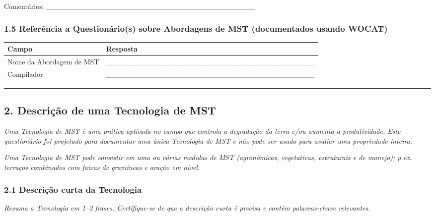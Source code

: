 Comentários: \_\_\_\_\_\_\_\_\_\_\_\_\_\_\_\_\_\_\_\_\_\_\_\_\_\_\_\_\_\_\_\_\_\_\_\_\_\_\_\_

\subsubsection{1.5 Referência a Questionário(s) sobre Abordagens de MST (documentados usando WOCAT)}\label{referuxeancia-a-questionuxe1rios-sobre-abordagens-de-mst-documentados-usando-wocat}

{
\begin{longtable}[]{@{}ll@{}}
\toprule\noalign{}
Campo & Resposta \\
\midrule\noalign{}
\endhead
\bottomrule\noalign{}
\endlastfoot
Nome da Abordagem de MST & \_\_\_\_\_\_\_\_\_\_\_\_\_\_\_\_\_\_\_\_\_\_\_\_\_\_\_\_\_\_\_\_\_\_\_\_\_\_\_\_ \\
Compilador & \_\_\_\_\_\_\_\_\_\_\_\_\_\_\_\_\_\_\_\_\_\_\_\_\_\_\_\_\_\_\_\_\_\_\_\_\_\_\_\_ \\
\end{longtable}
}

\newpage

\begin{center}\rule{0.5\linewidth}{0.5pt}\end{center}

\subsection{2. Descrição de uma Tecnologia de MST}\label{descriuxe7uxe3o-de-uma-tecnologia-de-mst}

\emph{Uma Tecnologia de MST é uma prática aplicada no campo que controla a degradação da terra e/ou aumenta a produtividade. Este questionário foi projetado para documentar uma única Tecnologia de MST e não pode ser usado para avaliar uma propriedade inteira.}

\emph{Uma Tecnologia de MST pode consistir em uma ou várias medidas de MST (agronômicas, vegetativas, estruturais e de manejo); p.ex. terraços combinados com faixas de gramíneas e aração em nível.}

\subsubsection{2.1 Descrição curta da Tecnologia}\label{descriuxe7uxe3o-curta-da-tecnologia}

\emph{Resuma a Tecnologia em 1--2 frases. Certifique-se de que a descrição curta é precisa e contém palavras-chave relevantes.}

